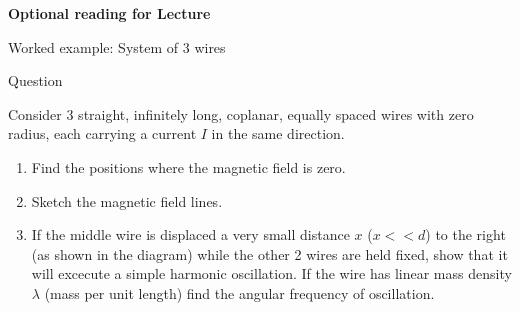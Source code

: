 
\begin{frame}[plain,c]
\begin{center}
{\Huge \bf Optional reading for Lecture \thislecture}
\end{center}
\end{frame}


%
%

{
\problemslide

%
%
%

\begin{frame}{Worked example: System of 3 wires}

  \begin{blockexmplque}{Question}
    \begin{minipage}[r]{0.75\textwidth}
      Consider 3 straight, infinitely long, coplanar,
      equally spaced wires with zero radius,
      each carrying a current $I$ in the same direction.
      \begin{enumerate}
        \item Find the positions where the magnetic field is zero.
        \item Sketch the magnetic field lines.
        \item If the middle wire is displaced a very small distance $x$
         ($x << d$) to the right (as shown in the diagram)
         while the other 2 wires are held fixed,
         show that it will excecute a simple harmonic oscillation.
         If the wire has linear mass density $\lambda$ (mass per unit length)
         find the angular frequency of oscillation.
      \end{enumerate}
    \end{minipage}
    \begin{minipage}[l]{0.20\textwidth}
     \begin{center}

\end{center}
\end{minipage}
\end{blockexmplque}
\end{frame}}
